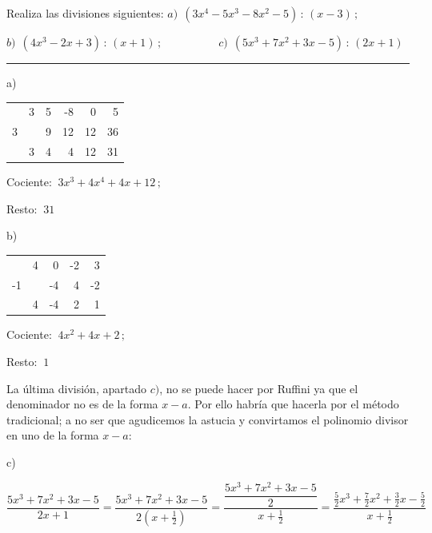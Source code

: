 \vspace{5mm}

\begin{miejercicio}

Realiza las divisiones siguientes:
\hspace{1.1cm} $a)\ \ (3x^4-5x^3-8x^2-5) \, : \, (x-3)\, ;$

\vspace{2mm}$b) \ \ (4x^3-2x+3)\, : \, (x+1)	\, ;\quad  \qquad \qquad c)\ \ (5x^3+7x^2+3x-5)\, : \, (2x+1)$

\rule{250pt}{0.1pt}

\begin{multicols}{2}
a)
\begin{table}[H]
\centering
\begin{tabular}{r|rrrrr}
 & 3 & 5 & -8 & 0 & 5 \\
3 &  & 9 & 12 & 12 & 36 \\ \hline
 & 3 & 4 & 4 & \multicolumn{1}{r|}{12} & 31 \\ \cline{6-6} 
\end{tabular}
\end{table}
Cociente: $\ 3x^3+4x^4+4x+12\, ; \ $ 

Resto: $\ 31$

b)
\begin{table}[H]
\centering
\begin{tabular}{r|rrrr}
 & 4 & 0 & -2 & 3 \\
-1 &  & -4 & 4 & -2 \\ \hline
 & 4 & -4 & \multicolumn{1}{r|}{2} & 1 \\ \cline{5-5} 
\end{tabular}
\end{table}
Cociente: $\ 4x^2+4x+2\, ; \ $ 

Resto: $\ 1$	
\end{multicols}

\vspace{5mm}
La última división, apartado $c)$, no se puede hacer por Ruffini ya que el denominador no es de la forma $x-a$. Por ello habría que hacerla por el método tradicional; a no ser que agudicemos la astucia y convirtamos el polinomio divisor en uno de la forma $x-a$:

c) \vspace{2mm} \begin{small} $\dfrac{5x^3+7x^2+3x-5}{2x+1} = \dfrac{5x^3+7x^2+3x-5}{2(x+\frac 1 2)}  = \dfrac{ \dfrac{5x^3+7x^2+3x-5}{2} }{x+\frac 1 2}=\dfrac{\frac 5 2 x^3+\frac 7 2 x^2+\frac 3 2 x-\frac 5 2}{x+\frac 1 2}  $\end{small}


\end{miejercicio}
